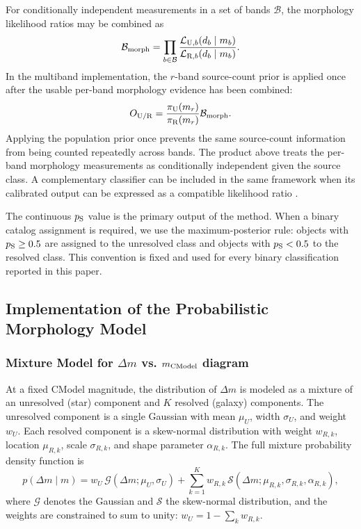 For conditionally independent measurements in a set of bands $\mathcal{B}$,
the morphology likelihood ratios may be combined as
\begin{equation*}
    \mathcal{B}_{\rm morph}
    =\prod_{b\in\mathcal{B}}
     \frac{\mathcal{L}_{{\rm U},b}(d_b\mid m_b)}
          {\mathcal{L}_{{\rm R},b}(d_b\mid m_b)}.
\end{equation*}
In the multiband implementation, the $r$-band source-count prior is applied
once after the usable per-band morphology evidence has been combined:
\begin{equation*}
    O_{\rm U/R}
    =\frac{\pi_{\rm U}(m_r)}{\pi_{\rm R}(m_r)}
     \mathcal{B}_{\rm morph}.
\end{equation*}
Applying the population prior once prevents the same source-count information
from being counted repeatedly across bands.  The product above treats the
per-band morphology measurements as conditionally independent given the
source class.  A complementary classifier can be included in the same
framework when its calibrated output can be expressed as a compatible
likelihood ratio
\citep{Henrion2011BayesianSG,Slater2020}.

The continuous $p_{\rm S}$ value is the primary output of the method.  When a
binary catalog assignment is required, we use the maximum-posterior rule:
objects with $p_{\rm S}\geq0.5$ are assigned to the unresolved class and
objects with $p_{\rm S}<0.5$ to the resolved class.  This convention is
fixed and used for every binary classification reported in this paper.

\subsection{Implementation of the Probabilistic Morphology Model}
\label{sec:implementation}

\subsubsection{Mixture Model for $\Delta m$ vs. $m_{\rm CModel}$ diagram}
\label{sec:mixture-model}

At a fixed CModel magnitude, the distribution of $\Delta m$ is modeled as a mixture of an unresolved (star) component and $K$ resolved (galaxy) components. The unresolved component is a single Gaussian with mean $\mu_U$, width $\sigma_U$, and weight $w_U$. Each resolved component is a skew-normal distribution with weight $w_{R,k}$, location $\mu_{R,k}$, scale $\sigma_{R,k}$, and shape parameter $\alpha_{R,k}$. The full mixture probability density function is
\begin{equation}
    p(\Delta m \mid m)
    = w_U\,\mathcal{G}(\Delta m;\mu_U,\sigma_U)
    + \sum_{k=1}^{K} w_{R,k}\,\mathcal{S}(\Delta m;\mu_{R,k},\sigma_{R,k},\alpha_{R,k}),
    \label{eq:mixture-model}
\end{equation}
where $\mathcal{G}$ denotes the Gaussian and $\mathcal{S}$ the skew-normal distribution, and the weights are constrained to sum to unity: $w_U=1-\sum_k w_{R,k}$.

